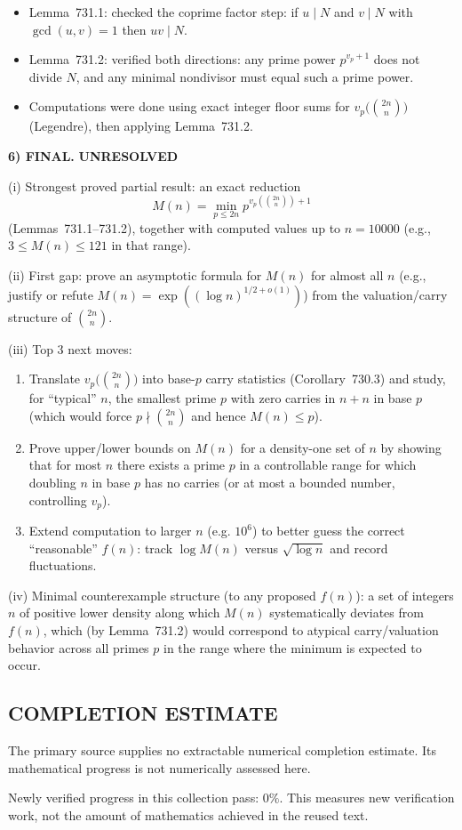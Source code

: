 \begin{itemize}
\item Lemma~731.1: checked the coprime factor step: if $u\mid N$ and $v\mid N$ with $\gcd(u,v)=1$ then $uv\mid N$.
\item Lemma~731.2: verified both directions: any prime power $p^{v_p+1}$ does not divide $N$, and any minimal nondivisor must equal such a prime power.
\item Computations were done using exact integer floor sums for $v_p\bigl(\binom{2n}{n}\bigr)$ (Legendre), then applying Lemma~731.2.
\end{itemize}

\medskip
\noindent\textbf{6) FINAL.} \textbf{UNRESOLVED}

(i) Strongest proved partial result: an exact reduction
\[M(n)=\min_{p\le 2n} p^{v_p\left(\binom{2n}{n}\right)+1}\]
(Lemmas~731.1--731.2), together with computed values up to $n=10000$ (e.g., $3\le M(n)\le 121$ in that range).

(ii) First gap: prove an asymptotic formula for $M(n)$ for almost all $n$ (e.g., justify or refute $M(n)=\exp((\log n)^{1/2+o(1)})$) from the valuation/carry structure of $\binom{2n}{n}$.

(iii) Top 3 next moves:
\begin{enumerate}
\item Translate $v_p\bigl(\binom{2n}{n}\bigr)$ into base-$p$ carry statistics (Corollary~730.3) and study, for ``typical'' $n$, the smallest prime $p$ with zero carries in $n+n$ in base $p$ (which would force $p\nmid\binom{2n}{n}$ and hence $M(n)\le p$).
\item Prove upper/lower bounds on $M(n)$ for a density-one set of $n$ by showing that for most $n$ there exists a prime $p$ in a controllable range for which doubling $n$ in base $p$ has no carries (or at most a bounded number, controlling $v_p$).
\item Extend computation to larger $n$ (e.g. $10^6$) to better guess the correct ``reasonable'' $f(n)$: track $\log M(n)$ versus $\sqrt{\log n}$ and record fluctuations.
\end{enumerate}

(iv) Minimal counterexample structure (to any proposed $f(n)$): a set of integers $n$ of positive lower density along which $M(n)$ systematically deviates from $f(n)$, which (by Lemma~731.2) would correspond to atypical carry/valuation behavior across all primes $p$ in the range where the minimum is expected to occur.




\subsection*{COMPLETION ESTIMATE}
The primary source supplies no extractable numerical completion estimate. Its mathematical progress is not numerically assessed here.

Newly verified progress in this collection pass: $0\%$. This measures new verification work, not the amount of mathematics achieved in the reused text.
